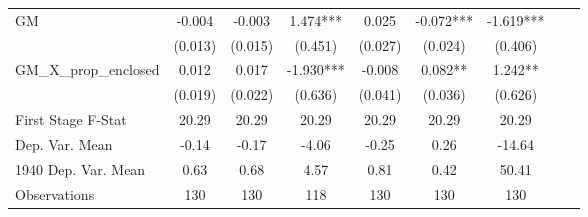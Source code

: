 \begin{tabular}{l*{8}{c}}
GM              &   -0.004   &   -0.003   &    1.474***&    0.025   &   -0.072***&   -1.619***\\
                &  (0.013)   &  (0.015)   &  (0.451)   &  (0.027)   &  (0.024)   &  (0.406)   \\
\addlinespace
GM\_X\_prop\_enclosed&    0.012   &    0.017   &   -1.930***&   -0.008   &    0.082** &    1.242** \\
                &  (0.019)   &  (0.022)   &  (0.636)   &  (0.041)   &  (0.036)   &  (0.626)   \\
\midrule
First Stage F-Stat&    20.29   &    20.29   &    20.29   &    20.29   &    20.29   &    20.29   \\
Dep. Var. Mean  &    -0.14   &    -0.17   &    -4.06   &    -0.25   &     0.26   &   -14.64   \\
1940 Dep. Var. Mean&     0.63   &     0.68   &     4.57   &     0.81   &     0.42   &    50.41   \\
Observations    &      130   &      130   &      118   &      130   &      130   &      130   \\
 \bottomrule \end{tabular}
